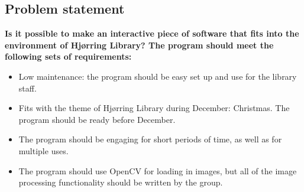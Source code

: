 \subsection{Problem statement}
\textbf{Is it possible to make an interactive piece of software that fits into the environment of Hj{\o}rring Library? The program should meet the following sets of requirements:}

\begin{itemize}
\item Low maintenance: the program should be easy set up and use for the library staff.
\item Fits with the theme of Hj{\o}rring Library during December: Christmas. The program should be ready before December.
\item The program should be engaging for short periods of time, as well as for multiple uses.
\item The program should use OpenCV for loading in images, but all of the image processing functionality should be written by the group.
\end{itemize}